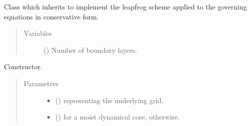 \documentclass[letterpaper,10pt,english]{sphinxmanual}
\begin{document}
\begin{fulllineitems}
\label{\detokenize{api:dycore.flux_isentropic.FluxIsentropicLeapfrog}}
Class which inherits {\hyperref[\detokenize{api:dycore.flux_isentropic.FluxIsentropic}]{}} to implement the leapfrog scheme applied to the governing equations
in conservative form.
\begin{quote}\begin{description}
\item[{Variables}] \leavevmode
{\hyperref[\detokenize{api:dycore.prognostic_isentropic.PrognosticIsentropic.nb}]{}} () \textendash{} Number of boundary layers.

\end{description}\end{quote}

\begin{fulllineitems}
\label{\detokenize{api:dycore.flux_isentropic.FluxIsentropicLeapfrog.__init__}}
Constructor.
\begin{quote}\begin{description}
\item[{Parameters}] \leavevmode\begin{itemize}
\item {} 
 () \textendash{} {\hyperref[\detokenize{api:grids.grid_xyz.GridXYZ}]{}} representing the underlying grid.

\item {} 
 () \textendash{}  for a moist dynamical core,  otherwise.

\end{itemize}

\end{description}\end{quote}

\end{fulllineitems}



\end{fulllineitems}
\end{document}
